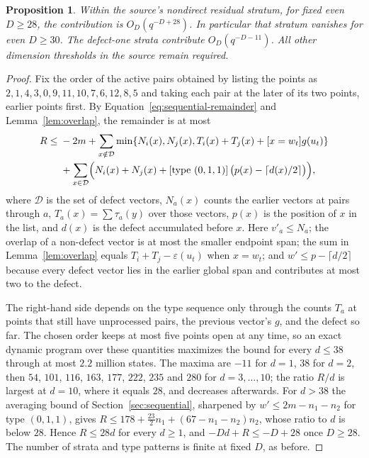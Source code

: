 \documentclass[11pt]{article}
\newtheorem{proposition}{Proposition}
\begin{document}
\begin{proposition}\label{prop:residual-28}
Within the source's nondirect residual stratum, for fixed even $D\ge28$,
the contribution is $O_D(q^{-D+28})$. In particular that stratum vanishes
for even $D\ge30$. The defect-one strata contribute $O_D(q^{-D-11})$.
All other dimension thresholds in the source remain required.
\end{proposition}
\begin{proof}
Fix the order of the active pairs obtained by listing the points as
$2,1,4,3,0,9,11,10,7,6,12,8,5$ and taking each pair at the later of its
two points, earlier points first. By Equation~\eqref{eq:sequential-remainder}
and Lemma~\ref{lem:overlap}, the remainder is at most
\begin{align*}
 R\le{}&-2m+\sum_{x\notin\mathcal D}\min\{N_i(x),N_j(x),T_i(x)+T_j(x)+[x=w_t]g(u_t)\}\\
 &+\sum_{x\in\mathcal D}\Bigl(N_i(x)+N_j(x)+[\text{type }(0,1,1)]\,\bigl(p(x)-\lceil d(x)/2\rceil\bigr)\Bigr),
\end{align*}
where $\mathcal D$ is the set of defect vectors, $N_a(x)$ counts the
earlier vectors at pairs through $a$, $T_a(x)=\sum\tau_a(y)$ over those
vectors, $p(x)$ is the position of $x$ in the list, and $d(x)$ is the
defect accumulated before $x$. Here $v'_a\le N_a$; the overlap of a
non-defect vector is at most the smaller endpoint span; the sum in
Lemma~\ref{lem:overlap} equals $T_i+T_j-\varepsilon(u_t)$ when $x=w_t$;
and $w'\le p-\lceil d/2\rceil$ because every defect vector lies in the
earlier global span and contributes at most two to the defect.

The right-hand side depends on the type sequence only through the counts
$T_a$ at points that still have unprocessed pairs, the previous vector's
$g$, and the defect so far. The chosen order keeps at most five points open
at any time, so an exact dynamic program over these quantities maximizes
the bound for every $d\le38$ through at most $2.2$ million states. The
maxima are $-11$ for $d=1$, $38$ for $d=2$, then $54$, $101$, $116$, $163$,
$177$, $222$, $235$ and $280$ for $d=3,\dots,10$; the ratio $R/d$ is
largest at $d=10$, where it equals $28$, and decreases afterwards. For
$d>38$ the averaging bound of Section~\ref{sec:sequential}, sharpened by
$w'\le2m-n_1-n_2$ for type $(0,1,1)$, gives
$R\le178+\tfrac{23}2n_1+(67-n_1-n_2)n_2$, whose ratio to $d$ is below $28$.
Hence $R\le28d$ for every $d\ge1$, and $-Dd+R\le-D+28$ once $D\ge28$. The
number of strata and type patterns is finite at fixed $D$, as before.
\end{proof}
\end{document}
